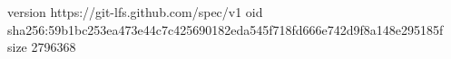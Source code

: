version https://git-lfs.github.com/spec/v1
oid sha256:59b1bc253ea473e44c7c425690182eda545f718fd666e742d9f8a148e295185f
size 2796368
